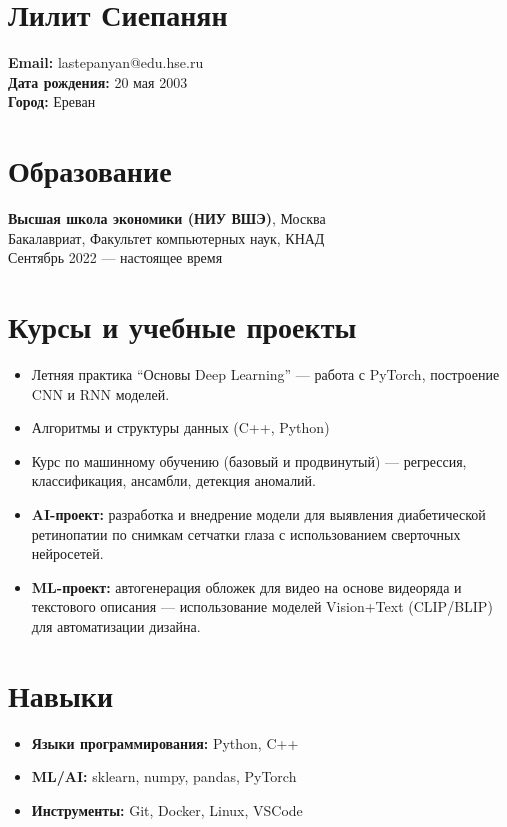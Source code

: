 \documentclass[a4paper,10pt]{article}
\begin{document}
\section*{Лилит Сиепанян}
\noindent
\textbf{Email:} lastepanyan@edu.hse.ru \\
\textbf{Дата рождения:} 20 мая 2003 \\
\textbf{Город:} Ереван \\

\section*{Образование}
\textbf{Высшая школа экономики (НИУ ВШЭ)}, Москва \\
Бакалавриат, Факультет компьютерных наук, КНАД \\
Сентябрь 2022 --- настоящее время

\section*{Курсы и учебные проекты}
\begin{itemize}[leftmargin=*]
  \item Летняя практика “Основы Deep Learning” — работа с PyTorch, построение CNN и RNN моделей.
  \item Алгоритмы и структуры данных (C++, Python)
  \item Курс по машинному обучению (базовый и продвинутый) — регрессия, классификация, ансамбли, детекция аномалий.
  \item \textbf{AI-проект:} разработка и внедрение модели для выявления диабетической ретинопатии по снимкам сетчатки глаза с использованием сверточных нейросетей.
  \item \textbf{ML-проект:} автогенерация обложек для видео на основе видеоряда и текстового описания — использование моделей Vision+Text (CLIP/BLIP) для автоматизации дизайна.
\end{itemize}

\section*{Навыки}
\begin{itemize}[leftmargin=*]
  \item \textbf{Языки программирования:} Python, C++
  \item \textbf{ML/AI:} sklearn, numpy, pandas, PyTorch
  \item \textbf{Инструменты:} Git, Docker, Linux, VSCode
\end{itemize}
\end{document}
